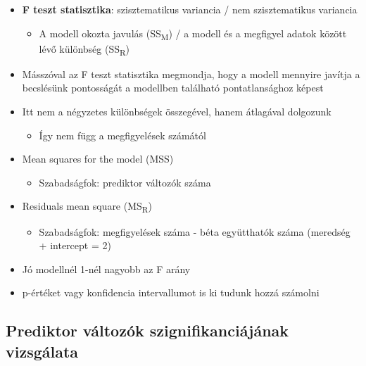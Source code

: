 \documentclass[
  letterpaper,
  DIV=11,
  numbers=noendperiod]{scrreprt}
\providecommand{\tightlist}{%
  \setlength{\itemsep}{0pt}\setlength{\parskip}{0pt}}\usepackage{longtable,booktabs,array}
\begin{document}
\begin{itemize}
\begin{itemize}
\begin{itemize}
      \begin{itemize}
      \item
        \textbf{F teszt statisztika}: szisztematikus variancia / nem
        szisztematikus variancia

        \begin{itemize}
        \tightlist
        \item
          A modell okozta javulás (SS\textsubscript{M}) / a modell és a
          megfigyel adatok között lévő különbség (SS\textsubscript{R})
        \end{itemize}
      \item
        Másszóval az F teszt statisztika megmondja, hogy a modell
        mennyire javítja a becslésünk pontosságát a modellben található
        pontatlansághoz képest
      \item
        Itt nem a négyzetes különbségek összegével, hanem átlagával
        dolgozunk

        \begin{itemize}
        \tightlist
        \item
          Így nem függ a megfigyelések számától
        \end{itemize}
      \item
        Mean squares for the model (MSS)

        \begin{itemize}
        \tightlist
        \item
          Szabadságfok: prediktor változók száma
        \end{itemize}
      \item
        Residuals mean square (MS\textsubscript{R})

        \begin{itemize}
        \tightlist
        \item
          Szabadságfok: megfigyelések száma - béta együtthatók száma
          (meredség + intercept = 2)
        \end{itemize}
      \item
        Jó modellnél 1-nél nagyobb az F arány
      \item
        p-értéket vagy konfidencia intervallumot is ki tudunk hozzá
        számolni
      \end{itemize}
    \end{itemize}
  \end{itemize}
\end{itemize}

\hypertarget{prediktor-vuxe1ltozuxf3k-szignifikanciuxe1juxe1nak-vizsguxe1lata}{%
\subsection{Prediktor változók szignifikanciájának
vizsgálata}\label{prediktor-vuxe1ltozuxf3k-szignifikanciuxe1juxe1nak-vizsguxe1lata}}
\end{document}
